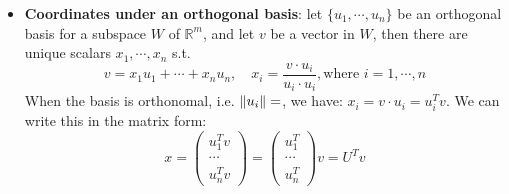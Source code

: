 \documentclass{report}
\begin{document}
\begin{itemize}
\item \textbf{Coordinates under an orthogonal basis}: let $\{u_1, \cdots, u_n\}$ be an orthogonal basis for a subspace $W$ of $\mathbb{R}^m$, and let $v$ be a vector in $W$, then there are unique scalars $x_1, \cdots, x_n$ s.t. 
\begin{equation}
v = x_1 u_1 + \cdots + x_n u_n, \quad x_i = \frac{v \cdot u_i}{u_i \cdot u_i}, \text{where } i = 1, \cdots, n
\end{equation}
When the basis is orthonomal, i.e. $\lVert u_i\rVert = $, we have: $x_i = v \cdot u_i = u_i^T v$. We can write this in the matrix form: 
\begin{equation}
x = \left( \begin{array}{c} u_1^T v\\ \cdots \\ u_n^T v \end{array} \right) = \left( \begin{array}{c} u_1^T \\ \cdots \\ u_n^T \end{array} \right) v = U^T v
\end{equation}
\end{itemize}
\end{document}
